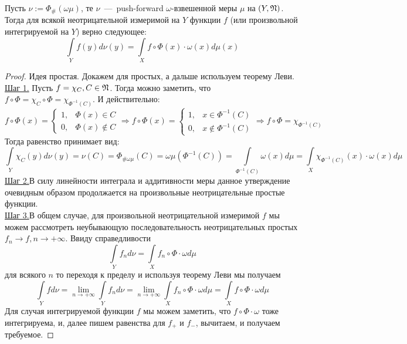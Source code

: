\begin{theorem}
    Пусть $\nu := \Phi_{\#}(\omega \mu)$, те $\nu$~---~push-forward $\omega$-взвешенной меры $\mu$ на $(Y, \mathfrak{N})$. Тогда для всякой неотрицательной измеримой на $Y$ функции $f$ (или произвольной интегрируемой на $Y$) верно следующее: \[\int\limits_{Y} f(y)d\nu(y) = \int\limits_X f\circ\Phi(x)\cdot\omega(x) d\mu(x)\]
\end{theorem}
\begin{proof}
    Идея простая. Докажем для простых, а дальше используем теорему Леви. \\
    \underline{Шаг 1.} Пусть $f = \chi_C, C \in \mathfrak{N}$. Тогда можно заметить, что $f \circ \Phi = \chi_C \circ \Phi = \chi_{\Phi^{-1}(C)}$. И действительно: \[ f \circ \Phi(x) = \begin{cases}
        1, & \Phi(x) \in C \\ 0, & \Phi(x) \notin C 
    \end{cases} \Longrightarrow f \circ \Phi(x) = \begin{cases}
        1, & x \in \Phi^{-1}(C) \\ 0, & x \notin \Phi^{-1}(C)
    \end{cases} \Longrightarrow f \circ \Phi = \chi_{\Phi^{-1}(C)}\]
    Тогда равенство принимает вид: \[\int\limits_Y \chi_C(y)d\nu(y) = \nu(C) = \Phi_{\#\omega\mu}(C) = \omega\mu(\Phi^{-1}(C)) = \int\limits_{\Phi^{-1}(C)} \omega(x) d\mu =\int\limits_X \chi_{\Phi^{-1}(C)}(x)\cdot\omega(x) d\mu\]
    \underline{Шаг 2.}В силу линейности интеграла и аддитивности меры данное утверждение очевидным образом продолжается на произвольные неотрицательные простые функции. \\
    \underline{Шаг 3.}В общем случае, для произвольной неотрицательной измеримой $f$ мы можем рассмотреть неубывающую последовательность неотрицательных простых $f_n \rightarrow f, n \rightarrow +\infty$. Ввиду справедливости \[\int\limits_Y f_nd\nu = \int\limits_X f_n \circ \Phi \cdot \omega d\mu\]
    для всякого $n$ то переходя к пределу и используя теорему Леви мы получаем \[\int\limits_Y fd\nu = \lim\limits_{n \rightarrow +\infty} \int\limits_Y f_nd\nu = \lim\limits_{n \rightarrow +\infty} \int\limits_X f_n \circ \Phi \cdot \omega d\mu = \int\limits_X f \circ \Phi \cdot \omega d\mu\]
    Для случая интегрируемой функции $f$ мы можем заметить, что $f \circ \Phi \cdot \omega$ тоже интегрируема, и, далее пишем равенства для $f_+$ и $f_-$, вычитаем, и получаем требуемое.
\end{proof}
